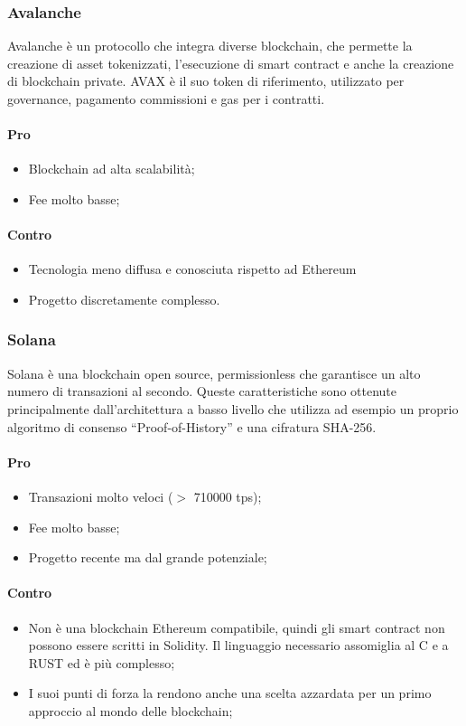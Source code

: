     \subsubsection{Avalanche}
    Avalanche è un protocollo che integra diverse blockchain, che permette la creazione di asset tokenizzati, l'esecuzione di smart contract e anche la creazione di blockchain private. 
    AVAX è il suo token di riferimento, utilizzato per governance, pagamento commissioni e gas per i contratti.
    \paragraph{Pro}
    \begin{itemize}
        \item Blockchain ad alta scalabilità;
        \item Fee molto basse;
    \end{itemize}
    \paragraph{Contro}
    \begin{itemize}
        \item Tecnologia meno diffusa e conosciuta rispetto ad Ethereum
        \item Progetto discretamente complesso.
    \end{itemize}
    
    \subsubsection{Solana}
    Solana è una blockchain open source, permissionless che garantisce un alto numero di transazioni al secondo. Queste caratteristiche sono ottenute principalmente dall’architettura a basso livello
    che utilizza ad esempio un proprio algoritmo di consenso “Proof-of-History” e una cifratura SHA-256.
    \paragraph{Pro}
    \begin{itemize}
        \item Transazioni molto veloci ($>$ 710000 tps);
        \item Fee molto basse;
        \item Progetto recente ma dal grande potenziale;
    \end{itemize}
    \paragraph{Contro}
    \begin{itemize}
        \item Non è una blockchain Ethereum compatibile, quindi gli smart contract non possono essere scritti in Solidity. Il linguaggio necessario assomiglia al C e a RUST ed è più complesso;
        \item I suoi punti di forza la rendono anche una scelta azzardata per un primo approccio al mondo delle blockchain;
    \end{itemize}
    
